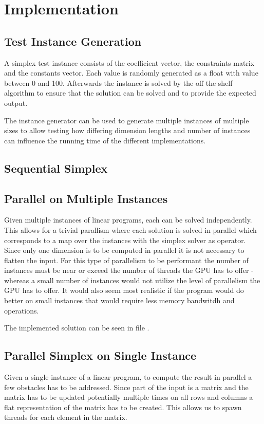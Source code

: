 \section{Implementation}
\subsection{Test Instance Generation}
A simplex test instance consists of the coefficient vector, the constraints matrix and the constants vector. Each value is randomly generated as a float with value between 0 and 100. Afterwards the instance is solved by the off the shelf algorithm to ensure that the solution can be solved and to provide the expected output. 

The instance generator can be used to generate multiple instances of multiple sizes to allow testing how differing dimension lengths and number of instances can influence the running time of the different implementations.


\subsection{Sequential Simplex}

\subsection{Parallel on Multiple Instances}
Given multiple instances of linear programs, each can be solved independently. This allows for a trivial parallism where each solution is solved in parallel which corresponds to a map over the instances with the simplex solver as operator. Since only one dimension is to be computed in parallel it is not necessary to flatten the input. For this type of parallelism to be performant the number of instances must be near or exceed the number of threads the GPU has to offer - whereas a small number of instances would not utilize the level of parallelism the GPU has to offer. It would also seem most realistic if the program would do better on small instances that would require less memory bandwitdh and operations.

The implemented solution can be seen in file .

\subsection{Parallel Simplex on Single Instance}
Given a single instance of a linear program, to compute the result in parallel a few obstacles has to be addressed. Since part of the input is a matrix and the matrix has to be updated potentially multiple times on all rows and columns a flat representation of the matrix has to be created. This allows us to spawn threads for each element in the matrix. 

